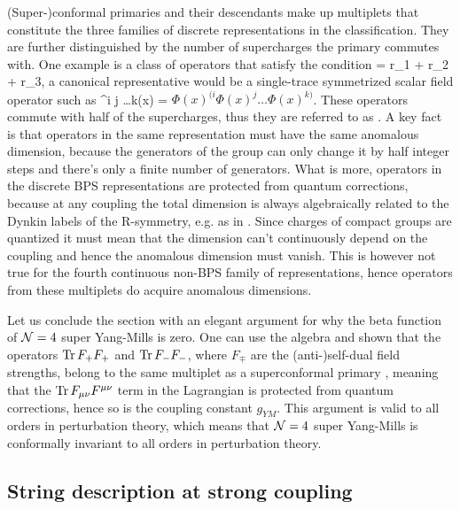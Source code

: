(Super-)conformal primaries and their descendants make up multiplets that constitute the three families of discrete representations in the classification.
They are further distinguished by the number of supercharges the primary commutes with.
One example is a class of operators that satisfy the condition 
\beq
	\label{eq:halfBPS}
	\Delta = r_1 + r_2 + r_3,
\eeq 
a canonical representative would be a single-trace symmetrized scalar field operator such as 
\beq
	^{i j \dots k}(x) = \tr \( \Phi(x)^{(i} \Phi(x)^j \dots \Phi(x)^{k)} \).
\eeq
These operators commute with half of the supercharges, thus they are referred to as . 
A key fact is that operators in the same representation must have the same anomalous dimension, because the generators of the group can only change it by half integer steps and there's only a finite number of generators. 
What is more, operators in the discrete BPS representations are protected from quantum corrections, because at any coupling the total dimension is always algebraically related to the Dynkin labels of the R-symmetry, e.g. as in . 
Since charges of compact groups are quantized it must mean that the dimension can't continuously depend on the coupling and hence the anomalous dimension must vanish. 
This is however not true for the fourth continuous non-BPS family of representations, hence operators from these multiplets do acquire anomalous dimensions.

Let us conclude the section with an elegant argument for why the beta function of $\mathcal{N}=4$ super Yang-Mills is zero.
One can use the algebra and shown that the operators $\mathrm{Tr} \, F_+ F_+$ and $\mathrm{Tr} \, F_- F_- $, where $F_\mp$ are the (anti-)self-dual field strengths, belong to the same multiplet as a superconformal primary \cite{Minahan:2010js}, meaning that the $\mathrm{Tr} \, F_{\mu\nu} F^{\mu\nu}$ term in the Lagrangian is protected from quantum corrections, hence so is the coupling constant $g_{YM}$. 
This argument is valid to all orders in perturbation theory, which means that $\mathcal{N}=4$ super Yang-Mills is conformally invariant to all orders in perturbation theory.

\subsection{String description at strong coupling}
\label{sec:n4_strong}

